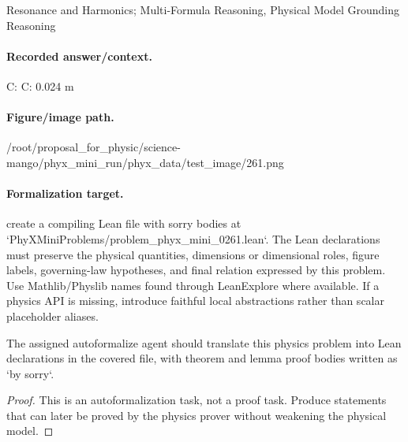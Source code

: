 Resonance and Harmonics; Multi-Formula Reasoning, Physical Model Grounding Reasoning

\paragraph{Recorded answer/context.}
C: C: 0.024 m

\paragraph{Figure/image path.}
/root/proposal\_for\_physic/science-mango/phyx\_mini\_run/phyx\_data/test\_image/261.png

\paragraph{Formalization target.}
create a compiling Lean file with sorry bodies at `PhyXMiniProblems/problem\_phyx\_mini\_0261.lean`. The Lean declarations must preserve the physical quantities, dimensions or dimensional roles, figure labels, governing-law hypotheses, and final relation expressed by this problem.
Use Mathlib/Physlib names found through LeanExplore where available. If a physics API is missing, introduce faithful local abstractions rather than scalar placeholder aliases.

\begin{theorem}
\label{thm:physics:phyx_mini_0261:target}
The assigned autoformalize agent should translate this physics problem into Lean declarations in the covered file, with theorem and lemma proof bodies written as `by sorry`.
\end{theorem}
\begin{proof}
This is an autoformalization task, not a proof task. Produce statements that can later be proved by the physics prover without weakening the physical model.
\end{proof}

